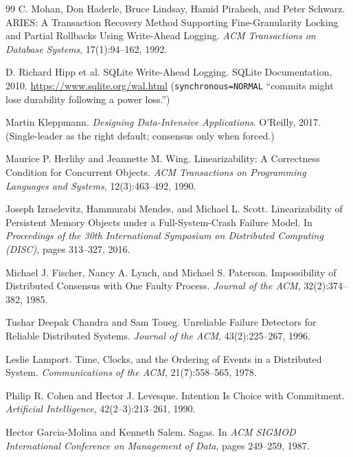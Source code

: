 \documentclass[11pt,a4paper]{article}
\theoremstyle{definition}
\theoremstyle{remark}
\begin{document}
\begin{thebibliography}{99}
C. Mohan, Don Haderle, Bruce Lindsay, Hamid Pirahesh, and Peter Schwarz.
\newblock ARIES: A Transaction Recovery Method Supporting Fine-Granularity Locking and Partial Rollbacks Using Write-Ahead Logging.
\newblock \textit{ACM Transactions on Database Systems}, 17(1):94--162, 1992.

D. Richard Hipp et al.
\newblock SQLite Write-Ahead Logging.
\newblock SQLite Documentation, 2010.
\newblock \url{https://www.sqlite.org/wal.html}
\newblock (\texttt{synchronous=NORMAL} ``commits might lose durability following a power loss.'')

Martin Kleppmann.
\newblock \textit{Designing Data-Intensive Applications}.
\newblock O'Reilly, 2017.
\newblock (Single-leader as the right default; consensus only when forced.)

Maurice P. Herlihy and Jeannette M. Wing.
\newblock Linearizability: A Correctness Condition for Concurrent Objects.
\newblock \textit{ACM Transactions on Programming Languages and Systems}, 12(3):463--492, 1990.

Joseph Izraelevitz, Hammurabi Mendes, and Michael L. Scott.
\newblock Linearizability of Persistent Memory Objects under a Full-System-Crash Failure Model.
\newblock In \textit{Proceedings of the 30th International Symposium on Distributed Computing (DISC)}, pages 313--327, 2016.

Michael J. Fischer, Nancy A. Lynch, and Michael S. Paterson.
\newblock Impossibility of Distributed Consensus with One Faulty Process.
\newblock \textit{Journal of the ACM}, 32(2):374--382, 1985.

Tushar Deepak Chandra and Sam Toueg.
\newblock Unreliable Failure Detectors for Reliable Distributed Systems.
\newblock \textit{Journal of the ACM}, 43(2):225--267, 1996.

Leslie Lamport.
\newblock Time, Clocks, and the Ordering of Events in a Distributed System.
\newblock \textit{Communications of the ACM}, 21(7):558--565, 1978.

Philip R. Cohen and Hector J. Levesque.
\newblock Intention Is Choice with Commitment.
\newblock \textit{Artificial Intelligence}, 42(2--3):213--261, 1990.

Hector Garcia-Molina and Kenneth Salem.
\newblock Sagas.
\newblock In \textit{ACM SIGMOD International Conference on Management of Data}, pages 249--259, 1987.


\end{thebibliography}
\end{document}
